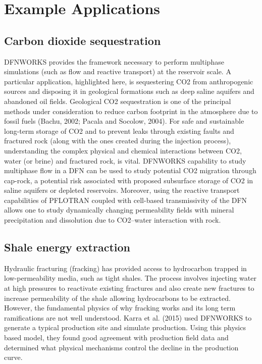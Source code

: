 \documentclass[letterpaper,10pt,english]{sphinxmanual}
\begin{document}
\begin{DUlineblock}{0em}
\item[] 
\item[] 
\end{DUlineblock}


\chapter{Example Applications}
\label{applications:applications-chapter}\label{applications::doc}\label{applications:example-applications}

\section{Carbon dioxide sequestration}
\label{applications:carbon-dioxide-sequestration}
DFNWORKS provides the framework necessary to perform multiphase simulations (such as flow and reactive transport) at the reservoir scale. A particular application, highlighted here, is sequestering CO2 from anthropogenic sources and disposing it in geological formations such as deep saline aquifers and abandoned oil fields. Geological CO2 sequestration is one of the principal methods under consideration to reduce carbon footprint in the atmosphere due to fossil fuels (Bachu, 2002; Pacala and Socolow, 2004). For safe and sustainable long-term storage of CO2 and to prevent leaks through existing faults and fractured rock (along with the ones created during the injection process), understanding the complex physical and chemical interactions between CO2, water (or brine) and fractured rock, is vital. DFNWORKS capability to study multiphase flow in a DFN can be used to study potential CO2 migration through cap-rock, a potential risk associated with proposed subsurface storage of CO2 in saline aquifers or depleted reservoirs. Moreover, using the reactive transport capabilities of PFLOTRAN coupled with cell-based transmissivity of the DFN allows one to study dynamically changing permeability fields with mineral precipitation and dissolution due to CO2–water interaction with rock.


\section{Shale energy extraction}
\label{applications:shale-energy-extraction}
Hydraulic fracturing (fracking) has provided access to hydrocarbon trapped in low-permeability media, such as tight shales. The process involves injecting water at high pressures to reactivate existing fractures and also create new fractures to increase permeability of the shale allowing hydrocarbons to be extracted. However, the fundamental physics of why fracking works and its long term ramifications are not well understood. Karra et al. (2015) used DFNWORKS to generate a typical production site and simulate production. Using this physics based model, they found good agreement with production field data and determined what physical mechanisms control the decline in the production curve.
\end{document}
